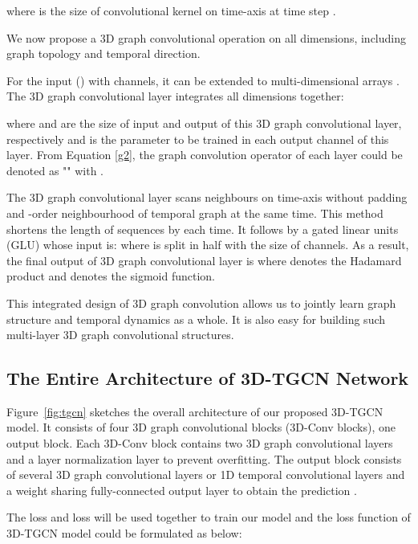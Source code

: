 \documentclass{article}
\begin{document}
where  is the size of convolutional kernel on time-axis at time step .

We now propose a 3D graph convolutional operation on all dimensions, including graph topology and temporal direction. 



For the input  () with  channels, it can be extended to multi-dimensional arrays . The 3D graph convolutional layer integrates all dimensions together: 


where  and  are the size of input and output of this 3D  graph convolutional layer,  respectively and  is the parameter to be trained in each output channel of this layer. From Equation \ref{g2}, the graph convolution operator of each layer could be denoted as "" with . 

The 3D graph convolutional layer scans  neighbours on time-axis without padding and -order neighbourhood of temporal graph  at the same time. This method shortens the length of sequences by  each time. It follows by a gated linear units (GLU) whose input is:  where  is split in half with the size of  channels. As a result, the final output of 3D graph convolutional layer is  where  denotes the Hadamard product and  denotes the sigmoid function.

This integrated design of 3D graph convolution allows us 
to jointly learn graph structure and temporal dynamics as a whole. It is also easy for building such multi-layer 3D graph convolutional structures. 



\subsection{The Entire Architecture of 3D-TGCN Network}
Figure~\ref{fig:tgcn} sketches the overall architecture of our proposed  3D-TGCN model. It consists of four 3D graph convolutional blocks (3D-Conv blocks), one output block. Each 3D-Conv block contains two 3D graph convolutional layers and a layer normalization layer to prevent overfitting. The output block consists of several 3D graph convolutional layers or 1D temporal convolutional layers and a weight sharing fully-connected output layer to obtain the prediction . 

The  loss and  loss will be used together to train our model and the loss function of 3D-TGCN model could be formulated as below:
\end{document}
